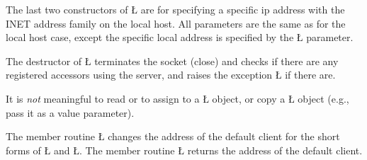 \documentclass[openright,twoside]{report}
\begin{document}
The last two constructors of \LGinlinetrue\LGbegin\lgrinde\L{}\endlgrinde\LGend{} are for specifying a specific ip address with the INET address family on the local host.
All parameters are the same as for the local host case, except the specific local address is specified by the \LGinlinetrue\LGbegin\lgrinde\L{}\endlgrinde\LGend{} parameter.

The destructor of \LGinlinetrue\LGbegin\lgrinde\L{}\endlgrinde\LGend{} terminates the socket (close) and checks if there are any registered accessors using the server, and raises the exception \LGinlinetrue\LGbegin\lgrinde\L{}\endlgrinde\LGend{} if there are.

It is \emph{not} meaningful to read or to assign to a \LGinlinetrue\LGbegin\lgrinde\L{}\endlgrinde\LGend{} object, or copy a \LGinlinetrue\LGbegin\lgrinde\L{}\endlgrinde\LGend{} object (e.g., pass it as a value parameter).

The member routine \LGinlinetrue\LGbegin\lgrinde\L{}\endlgrinde\LGend{} changes the address of the default client for the short forms of \LGinlinetrue\LGbegin\lgrinde\L{}\endlgrinde\LGend{} and \LGinlinetrue\LGbegin\lgrinde\L{}\endlgrinde\LGend{}.
The member routine \LGinlinetrue\LGbegin\lgrinde\L{}\endlgrinde\LGend{} returns the address of the default client.
\end{document}
